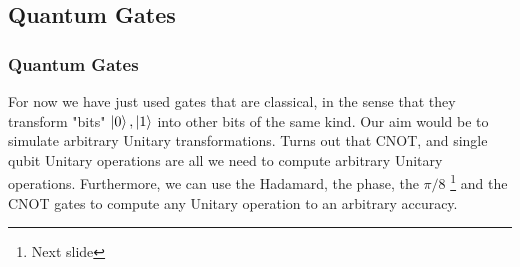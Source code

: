 \documentclass{beamer}
\begin{document}
\subsection{Quantum Gates}
\begin{frame}
    \frametitle{Quantum Gates}
    For now we have just used gates that are classical, in the sense that they transform "bits"
    $\ket{0}, \ket{1}$ into other bits of the same kind. Our aim would be to simulate arbitrary
    Unitary transformations. Turns out that CNOT, and single qubit Unitary operations are all we need
    to compute arbitrary Unitary operations. Furthermore, we can use the Hadamard,
    the phase, the $\pi/8$ \footnote{Next slide} and the CNOT gates to compute any Unitary operation to an arbitrary accuracy. \\
\end{frame}
\end{document}

